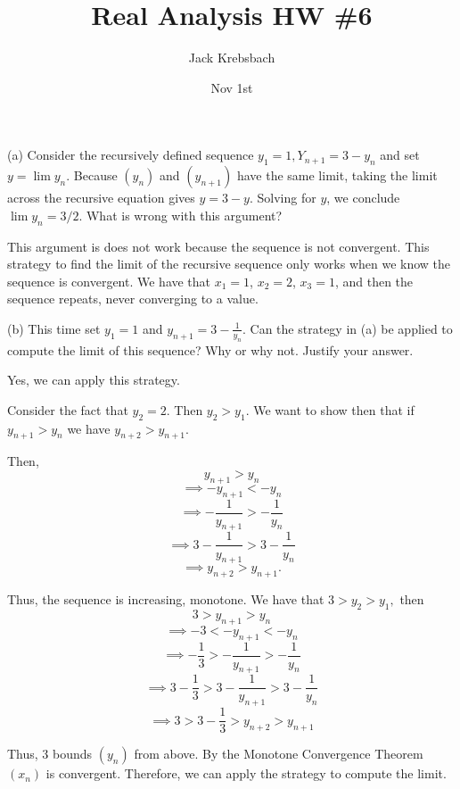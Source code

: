 \documentclass{report}
\title{Real Analysis HW \#6}
\author{Jack Krebsbach }
\date{Nov 1st}
\begin{document}
\maketitle


(a) Consider the recursively defined sequence $y_1=1, Y_{n+1}=3-y_n$ and set $y=\lim y_n$. Because $\left(y_n\right)$ and $\left(y_{n+1}\right)$ have the same limit, taking the limit across the recursive equation gives $y=3-y$. Solving for $y$, we conclude $\lim y_n=3 / 2$. What is wrong with this argument?

\bigskip
\sol

This argument is does not work because the sequence is not convergent. This strategy to find the limit of the recursive sequence only works when we know the sequence is convergent. We have that $x_1 = 1$, $x_2 = 2$, $x_3 = 1$, and then the sequence repeats, never converging to a value.

\bigskip

\bigskip
(b) This time set $y_1=1$ and $y_{n+1}=3-\frac{1}{y_n}$. Can the strategy in (a) be applied to compute the limit of this sequence? Why or why not. Justify your answer.

\bigskip
\sol 

Yes, we can apply this strategy. 

Consider the fact that $y_2 = 2$. Then $y_2 > y_1$. We want to show then that if $y_{n+1} > y_{n}$ we have $y_{n+2} > y_{n+1}.$ 

Then,
$$y_{n+1}>y_n $$ $$ \implies -y_{n+1}<-y_{n} $$ $$ \implies-\frac{1}{y_{n+1}}>-\frac{1}{y_n} $$ $$ \implies3-\frac{1}{y_{n+1}}>3-\frac{1}{y_n} $$ $$ \implies y_{n+2}>y_{n+1}.$$

Thus, the sequence is increasing, monotone.
We have that $3 > y_2 > y_1,$ then
$$3 > y_{n+1}>y_n $$ $$ \implies -3 < -y_{n+1}<-y_{n} $$ $$ \implies-\frac{1}{3}> -\frac{1}{y_{n+1}}>-\frac{1}{y_n} $$ $$  \implies 3 - \frac{1}{3} >  3-\frac{1}{y_{n+1}}>3-\frac{1}{y_n} $$ $$\implies 3>  3 - \frac{1}{3} > y_{n+2}>y_{n+1}$$

Thus, 3 bounds $(y_n)$ from above. By the Monotone Convergence Theorem $(x_n)$ is convergent. Therefore, we can apply the strategy to compute the limit.

\pagebreak

\bigskip
\bigskip

\end{document}

